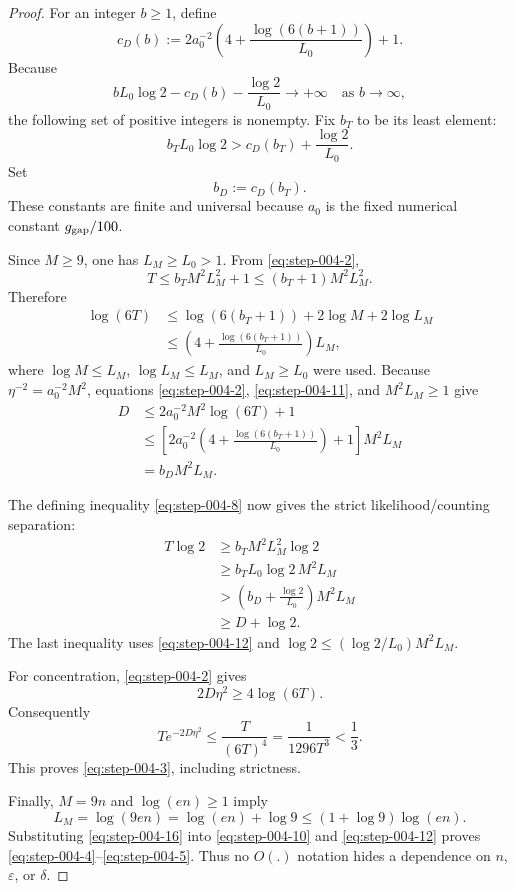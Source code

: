 \begin{proof}

For an integer \(b\ge 1\), define
\[
c_D(b):=
2a_0^{-2}\left(4+\frac{\log(6(b+1))}{L_0}\right)+1.
\tag{6}\label{eq:step-004-6}
\]
Because
\[
bL_0\log2-c_D(b)-\frac{\log2}{L_0}
\longrightarrow+\infty
\quad\text{as }b\longrightarrow\infty,
\tag{7}\label{eq:step-004-7}
\]
the following set of positive integers is nonempty. Fix \(b_T\) to be its least element:
\[
b_TL_0\log2>
c_D(b_T)+\frac{\log2}{L_0}.
\tag{8}\label{eq:step-004-8}
\]
Set
\[
b_D:=c_D(b_T).
\tag{9}\label{eq:step-004-9}
\]
These constants are finite and universal because \(a_0\) is the fixed numerical constant \(g_{\rm gap}/100\).

Since \(M\ge 9\), one has \(L_M\ge L_0>1\). From \eqref{eq:step-004-2},
\[
T\le b_TM^2L_M^2+1
\le(b_T+1)M^2L_M^2.
\tag{10}\label{eq:step-004-10}
\]
Therefore
\[
\begin{aligned}
\log(6T)
&\le\log(6(b_T+1))+2\log M+2\log L_M\\
&\le\left(4+\frac{\log(6(b_T+1))}{L_0}\right)L_M,
\end{aligned}
\tag{11}\label{eq:step-004-11}
\]
where \(\log M\le L_M\), \(\log L_M\le L_M\), and \(L_M\ge L_0\) were used. Because \(\eta^{-2}=a_0^{-2}M^2\), equations \eqref{eq:step-004-2}, \eqref{eq:step-004-11}, and \(M^2L_M\ge 1\) give
\[
\begin{aligned}
D
&\le2a_0^{-2}M^2\log(6T)+1\\
&\le
\left[2a_0^{-2}\left(4+\frac{\log(6(b_T+1))}{L_0}\right)+1\right]
M^2L_M\\
&=b_DM^2L_M.
\end{aligned}
\tag{12}\label{eq:step-004-12}
\]

The defining inequality \eqref{eq:step-004-8} now gives the strict likelihood/counting separation:
\[
\begin{aligned}
T\log2
&\ge b_TM^2L_M^2\log2\\
&\ge b_TL_0\log2\,M^2L_M\\
&>\left(b_D+\frac{\log2}{L_0}\right)M^2L_M\\
&\ge D+\log2.
\end{aligned}
\tag{13}\label{eq:step-004-13}
\]
The last inequality uses \eqref{eq:step-004-12} and
\(\log2\le (\log2/L_0)M^2L_M\).

For concentration, \eqref{eq:step-004-2} gives
\[
2D\eta^2\ge4\log(6T).
\tag{14}\label{eq:step-004-14}
\]
Consequently
\[
T e^{-2D\eta^2}
\le\frac{T}{(6T)^4}
=\frac1{1296T^3}
<\frac13.
\tag{15}\label{eq:step-004-15}
\]
This proves \eqref{eq:step-004-3}, including strictness.

Finally, \(M=9n\) and \(\log(en)\ge 1\) imply
\[
L_M=\log(9en)
=\log(en)+\log9
\le(1+\log9)\log(en).
\tag{16}\label{eq:step-004-16}
\]
Substituting \eqref{eq:step-004-16} into \eqref{eq:step-004-10} and \eqref{eq:step-004-12} proves \eqref{eq:step-004-4}--\eqref{eq:step-004-5}. Thus no \(O(.)\) notation hides a dependence on \(n\), \(\varepsilon\), or \(\delta\).

\end{proof}


